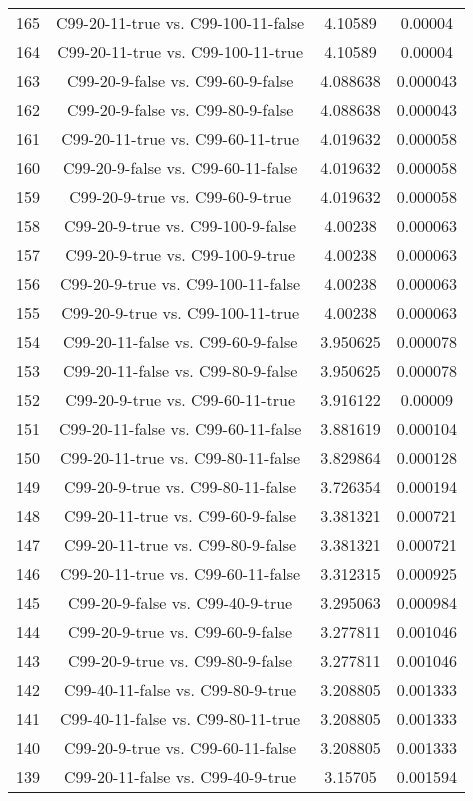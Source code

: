 \documentclass[a4paper,10pt]{article}
\begin{document}
\begin{landscape}
\begin{table}[!htp]
\begin{tabular}{cccc}
165&C99-20-11-true vs. C99-100-11-false&4.10589&0.00004\\
164&C99-20-11-true vs. C99-100-11-true&4.10589&0.00004\\
163&C99-20-9-false vs. C99-60-9-false&4.088638&0.000043\\
162&C99-20-9-false vs. C99-80-9-false&4.088638&0.000043\\
161&C99-20-11-true vs. C99-60-11-true&4.019632&0.000058\\
160&C99-20-9-false vs. C99-60-11-false&4.019632&0.000058\\
159&C99-20-9-true vs. C99-60-9-true&4.019632&0.000058\\
158&C99-20-9-true vs. C99-100-9-false&4.00238&0.000063\\
157&C99-20-9-true vs. C99-100-9-true&4.00238&0.000063\\
156&C99-20-9-true vs. C99-100-11-false&4.00238&0.000063\\
155&C99-20-9-true vs. C99-100-11-true&4.00238&0.000063\\
154&C99-20-11-false vs. C99-60-9-false&3.950625&0.000078\\
153&C99-20-11-false vs. C99-80-9-false&3.950625&0.000078\\
152&C99-20-9-true vs. C99-60-11-true&3.916122&0.00009\\
151&C99-20-11-false vs. C99-60-11-false&3.881619&0.000104\\
150&C99-20-11-true vs. C99-80-11-false&3.829864&0.000128\\
149&C99-20-9-true vs. C99-80-11-false&3.726354&0.000194\\
148&C99-20-11-true vs. C99-60-9-false&3.381321&0.000721\\
147&C99-20-11-true vs. C99-80-9-false&3.381321&0.000721\\
146&C99-20-11-true vs. C99-60-11-false&3.312315&0.000925\\
145&C99-20-9-false vs. C99-40-9-true&3.295063&0.000984\\
144&C99-20-9-true vs. C99-60-9-false&3.277811&0.001046\\
143&C99-20-9-true vs. C99-80-9-false&3.277811&0.001046\\
142&C99-40-11-false vs. C99-80-9-true&3.208805&0.001333\\
141&C99-40-11-false vs. C99-80-11-true&3.208805&0.001333\\
140&C99-20-9-true vs. C99-60-11-false&3.208805&0.001333\\
139&C99-20-11-false vs. C99-40-9-true&3.15705&0.001594\\

\end{tabular}
\end{table}
\end{landscape}
\end{document}
